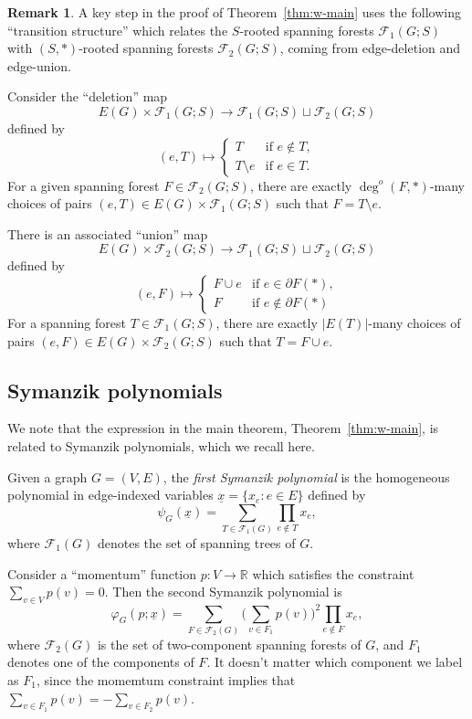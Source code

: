 \documentclass{amsart}
\theoremstyle{definition}
\newtheorem{rmk}[thm]{Remark}
\newcommand{\RR}{\mathbb{R}}
\newcommand{\trees}{\mathcal{F}_1}
\newcommand{\forests}{\mathcal{F}}
\newcommand{\degout}{\deg^o}
\begin{document}
\begin{rmk}
A key step in the proof of Theorem~\ref{thm:w-main} uses the following ``transition structure'' which relates the $S$-rooted spanning forests $\trees(G; S)$ with $(S,*)$-rooted spanning forests $\forests_2(G; S)$,
coming from edge-deletion and edge-union.

Consider the ``deletion'' map
\[
	E(G) \times \trees(G;S) \to \trees(G;S) \sqcup \forests_2(G;S)
\]
defined by
\[
	(e, T) \mapsto \begin{cases}
	T &\text{if } e\not\in T,\\
	T \setminus e &\text{if } e\in T.
	\end{cases}
\]
For a given spanning forest
$F \in \forests_2(G;S)$,
there are exactly $\degout(F, *)$-many choices of pairs $(e, T) \in E(G) \times \trees(G;S)$ such that
$F = T \setminus e$.

There is an associated ``union'' map 
\[
	E(G) \times \forests_2(G;S) \longrightarrow \trees(G;S) \sqcup \forests_2(G;S)
\]
defined by
\[
	(e, F) \mapsto \begin{cases}
		F \cup e &\text{if } e \in \partial F(*), \\
		F &\text{if } e \not\in \partial F(*)
	\end{cases}
\]
For a spanning forest $T \in \trees(G; S)$, 
there are exactly $|E(T)|$-many choices of pairs $(e, F) \in E(G) \times \forests_2(G; S)$ such that $T = F \cup e$. 
\end{rmk}

\subsection{Symanzik polynomials}

We note that the expression in the main theorem, Theorem~\ref{thm:w-main}, is related to Symanzik polynomials, which we recall here.

Given a graph $G = (V, E)$, the {\em first Symanzik polynomial} is the homogeneous polynomial in edge-indexed variables $\underline{x} = \{x_e : e \in E\}$ defined by
\[
	\psi_G(\underline{x}) = \sum_{T \in \trees(G)} \prod_{e \not \in T} x_e ,
\]
where $\trees(G)$ denotes the set of spanning trees of $G$.

Consider a ``momentum'' function $p: V \to \RR$ which satisfies the constraint $\sum_{v \in V} p(v) = 0$.
Then the second Symanzik polynomial is
\[
	\varphi_G(p; \underline{x}) = \sum_{F \in \forests_2(G)} \Big(\sum_{v \in F_1} p(v) \Big)^2 \prod_{e \not\in F} x_e ,
\]
where $\forests_2(G)$ is the set of two-component spanning forests of $G$, and $F_1$ denotes one of the components of $F$.
It doesn't matter which component we label as $F_1$, since the momemtum constraint %
implies that
$\sum_{v \in F_1} p(v)  = - \sum_{v \in F_2} p(v)$.
\end{document}
